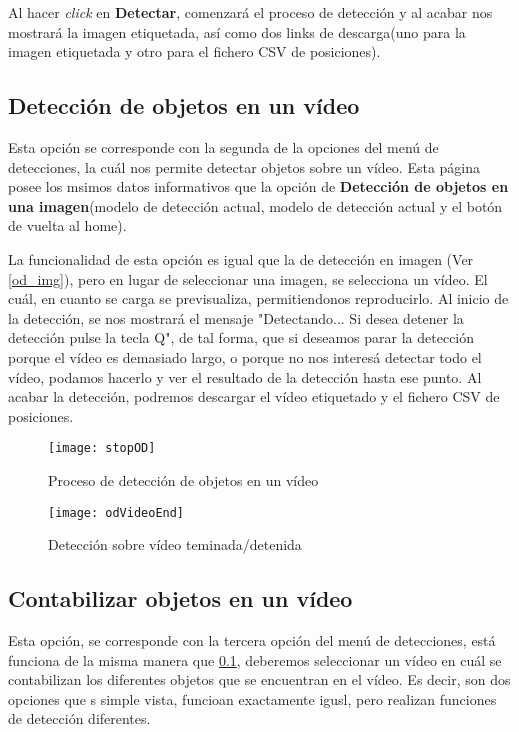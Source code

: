 
Al hacer \textit{click} en \textbf{Detectar}, comenzará el proceso de detección y al acabar nos mostrará la imagen etiquetada, así como dos links de descarga(uno para la imagen etiquetada y otro para el fichero CSV de posiciones).


\subsection{Detección de objetos en un vídeo} \label{odVideo}
Esta opción se corresponde con la segunda de la opciones del menú de detecciones, la cuál nos permite detectar objetos sobre un vídeo.
Esta página posee los msimos datos informativos que la opción de \textbf{Detección de objetos en una imagen}(modelo de detección actual, modelo de detección actual y el botón de vuelta al home).


La funcionalidad de esta opción es igual que la de detección en imagen (Ver \ref{od_img}), pero en lugar de seleccionar una imagen, se selecciona un vídeo.
El cuál, en cuanto se carga se previsualiza, permitiendonos reproducirlo. Al inicio de la detección, se nos mostrará el mensaje "Detectando... Si desea detener la detección pulse la tecla Q", de tal forma, que si deseamos parar la detección porque el vídeo es demasiado largo, 
o porque no nos interesá detectar todo el vídeo, podamos hacerlo y ver el resultado de la detección hasta ese punto. Al acabar la detección, podremos descargar el vídeo etiquetado y el fichero CSV de posiciones.

\begin{figure}[!h]
    \centering
    \texttt{[image: stopOD]}
    \caption{Proceso de detección de objetos en un vídeo}\label{fig:stopOD}
\end{figure}

\begin{figure}[!h]
    \centering
    \texttt{[image: odVideoEnd]}
    \caption{Detección sobre vídeo teminada/detenida}\label{fig:odVideoEnd}
\end{figure}

\subsection{Contabilizar objetos en un vídeo} \label{odTrack}
Esta opción, se corresponde con la tercera opción del menú de detecciones, está funciona de la misma manera que \ref{odVideo}, deberemos seleccionar un vídeo en cuál se contabilizan los diferentes objetos que se encuentran en el vídeo.
Es decir, son dos opciones que s simple vista, funcioan exactamente igusl, pero realizan funciones de detección diferentes.

